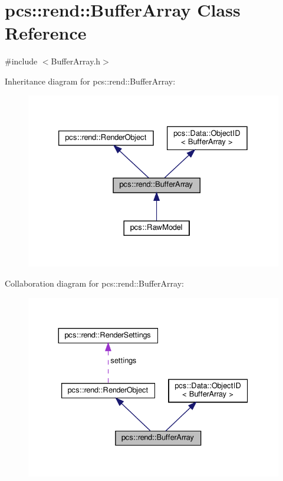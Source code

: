 \hypertarget{classpcs_1_1rend_1_1BufferArray}{}\section{pcs\+:\+:rend\+:\+:Buffer\+Array Class Reference}
\label{classpcs_1_1rend_1_1BufferArray}


{\ttfamily \#include $<$Buffer\+Array.\+h$>$}



Inheritance diagram for pcs\+:\+:rend\+:\+:Buffer\+Array\+:\nopagebreak
\begin{figure}[H]
\begin{center}
\leavevmode
\includegraphics[width=326pt]{classpcs_1_1rend_1_1BufferArray__inherit__graph}
\end{center}
\end{figure}


Collaboration diagram for pcs\+:\+:rend\+:\+:Buffer\+Array\+:\nopagebreak
\begin{figure}[H]
\begin{center}
\leavevmode
\includegraphics[width=330pt]{classpcs_1_1rend_1_1BufferArray__coll__graph}
\end{center}
\end{figure}

